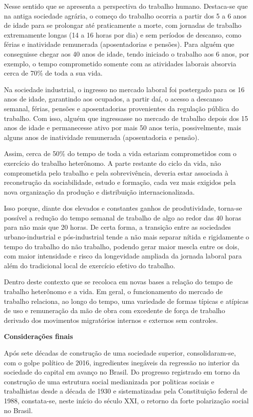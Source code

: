Nesse sentido que se apresenta a perspectiva do trabalho humano.
Destaca-se que na antiga sociedade agrária, o começo do trabalho ocorria
a partir dos 5 a 6 anos de idade para se prolongar até praticamente a
morte, com jornadas de trabalho extremamente longas (14 a 16 horas por
dia) e sem períodos de descanso, como férias e inatividade remunerada
(aposentadorias e pensões). Para alguém que conseguisse chegar aos 40
anos de idade, tendo iniciado o trabalho aos 6 anos, por exemplo, o
tempo comprometido somente com as atividades laborais absorvia cerca de
70\% de toda a sua vida.

Na sociedade industrial, o ingresso no mercado laboral foi postergado
para os 16 anos de idade, garantindo aos ocupados, a partir daí, o
acesso a descanso semanal, férias, pensões e aposentadorias provenientes
da regulação pública do trabalho. Com isso, alguém que ingressasse no
mercado de trabalho depois dos 15 anos de idade e permanecesse ativo por
mais 50 anos teria, possivelmente, mais alguns anos de inatividade
remunerada (aposentadoria e pensão).

Assim, cerca de 50\% do tempo de toda a vida estariam comprometidos com
o exercício do trabalho heterônomo. A parte restante do ciclo da vida,
não comprometida pelo trabalho e pela sobrevivência, deveria estar
associada à reconstrução da sociabilidade, estudo e formação, cada vez
mais exigidos pela nova organização da produção e distribuição
internacionalizada.

Isso porque, diante dos elevados e constantes ganhos de produtividade,
torna-se possível a redução do tempo semanal de trabalho de algo ao
redor das 40 horas para não mais que 20 horas. De certa forma, a
transição entre as sociedades urbano-industrial e pós-industrial tende a
não mais separar nítida e rigidamente o tempo do trabalho do não
trabalho, podendo gerar maior mescla entre os dois, com maior
intensidade e risco da longevidade ampliada da jornada laboral para além
do tradicional local de exercício efetivo do trabalho.

Dentro deste contexto que se recoloca em novas bases a relação do tempo
de trabalho heterônomo e a vida. Em geral, o funcionamento do mercado de
trabalho relaciona, ao longo do tempo, uma variedade de formas típicas e
atípicas de uso e remuneração da mão de obra com excedente de força de
trabalho derivado dos movimentos migratórios internos e externos sem
controles.

\textbf{Considerações finais}

Após sete décadas de construção de uma sociedade superior,
consolidaram-se, com o golpe político de 2016, ingredientes inegáveis da
regressão no interior da sociedade do capital em avanço no Brasil. Do
progresso registrado em torno da construção de uma estrutura social
medianizada por politicas sociais e trabalhistas desde a década de 1930
e sistematizadas pela Constituição federal de 1988, constata-se, neste
início do século XXI, o retorno da forte polarização social no Brasil.

